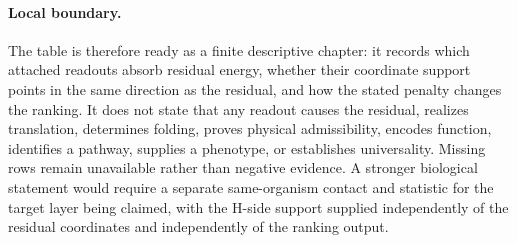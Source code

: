 \paragraph{Local boundary.}
The table is therefore ready as a finite descriptive chapter: it records which attached readouts absorb residual energy, whether their coordinate support points in the same direction as the residual, and how the stated penalty changes the ranking.  It does not state that any readout causes the residual, realizes translation, determines folding, proves physical admissibility, encodes function, identifies a pathway, supplies a phenotype, or establishes universality.  Missing rows remain unavailable rather than negative evidence.  A stronger biological statement would require a separate same-organism contact and statistic for the target layer being claimed, with the H-side support supplied independently of the residual coordinates and independently of the ranking output.

